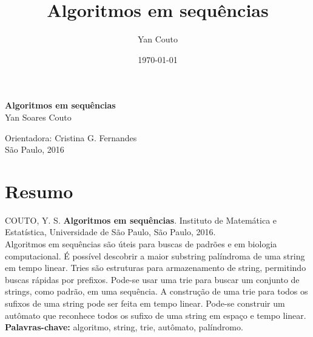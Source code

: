 \documentclass[11pt,oneside,a4paper, openany]{book}
\title{Algoritmos em sequências}
\author{Yan Couto}
\date{\today}
\begin{document}
\frontmatter 

\onehalfspacing  %

\thispagestyle{empty}
\begin{center}
    \vspace*{2.3cm}
    \textbf{\huge{Algoritmos em sequências}}\\
    
    \vspace*{1cm}
    \Large{Yan Soares Couto}

    \vskip 1.8cm
    Orientadora: Cristina G. Fernandes\\

    \vspace{\fill}
    \normalsize{São Paulo, 2016}
\end{center}

\chapter*{Resumo}

\noindent COUTO, Y. S. \textbf{Algoritmos em sequências}. 
 Instituto de Matemática e Estatística,
Universidade de São Paulo, São Paulo, 2016.
\\

Algoritmos em sequências são úteis para buscas de padrões e em biologia computacional. É possível descobrir a maior substring palíndroma de uma string em tempo linear. Tries são estruturas para armazenamento de string, permitindo buscas rápidas por prefixos. Pode-se usar uma trie para buscar um conjunto de strings, como padrão, em uma sequência. A construção de uma trie para todos os sufixos de uma string pode ser feita em tempo linear. Pode-se construir um autômato que reconhece todos os sufixo de uma string em espaço e tempo linear.
\\

\noindent \textbf{Palavras-chave:} algoritmo, string, trie, autômato, palíndromo.


\begingroup
\let\cleardoublepage\clearpage
\tableofcontents
\endgroup
\end{document}
